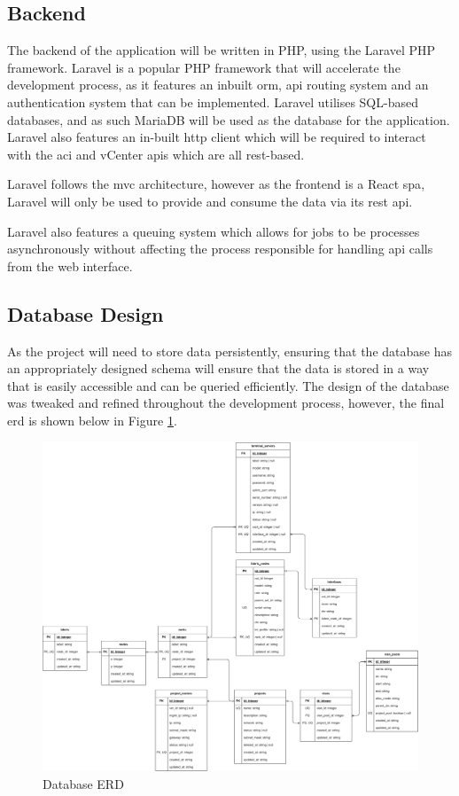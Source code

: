 \subsection{Backend}
\label{design:web-application:backend}
The backend of the application will be
written in PHP, using the Laravel PHP framework. Laravel is a popular PHP
framework that will accelerate the development process, as it features an
inbuilt \gls{orm}, \gls{api} routing system and an authentication system that
can be implemented. Laravel utilises SQL-based databases, and as such MariaDB
will be used as the database for the application. Laravel also features an
in-built \gls{http} client which will be required to interact with the
\gls{aci} and vCenter \gls{api}s which are all \gls{rest}-based.

Laravel
follows the \gls{mvc} architecture, however as the frontend is a React
\gls{spa}, Laravel will only be used to provide and consume the data via its
\gls{rest} \gls{api}.

Laravel also features a queuing system which allows for jobs to be processes asynchronously without affecting the process responsible for handling \gls{api} calls from the web interface.

\subsection{Database Design}
\label{design:web-application:database}
As the project will need to store data
persistently, ensuring that the database has an appropriately designed schema
will ensure that the data is stored in a way that is easily accessible and can
be queried efficiently. The design of the database was tweaked and refined
throughout the development process, however, the final \gls{erd} is shown below
in Figure \ref{fig:database-erd}.

\begin{figure}[H]
    \centering

    \includegraphics[scale=0.1]{images/erd.png}
    \caption{Database ERD}

    \label{fig:database-erd}
\end{figure}

